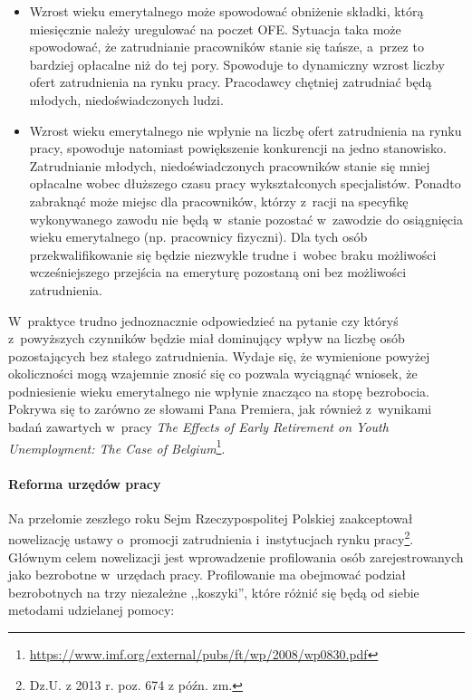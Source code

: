 \documentclass[12pt]{article}
\begin{document}
    \begin{itemize}
        \item Wzrost wieku emerytalnego może spowodować obniżenie składki, którą miesięcznie należy uregulować na poczet OFE. Sytuacja taka może spowodować, że zatrudnianie pracowników stanie się tańsze, a~przez to bardziej opłacalne niż do tej pory. Spowoduje to dynamiczny wzrost liczby ofert zatrudnienia na rynku pracy. Pracodawcy chętniej zatrudniać będą młodych, niedoświadczonych ludzi.
        \item Wzrost wieku emerytalnego nie wpłynie na liczbę ofert zatrudnienia na rynku pracy, spowoduje natomiast powiększenie konkurencji na jedno stanowisko. Zatrudnianie młodych, niedoświadczonych pracowników stanie się mniej opłacalne wobec dłuższego czasu pracy wykształconych specjalistów. Ponadto zabraknąć może miejsc dla pracowników, którzy z~racji na specyfikę wykonywanego zawodu nie będą w~stanie pozostać w~zawodzie do osiągnięcia wieku emerytalnego (np. pracownicy fizyczni). Dla tych osób przekwalifikowanie się będzie niezwykle trudne i~wobec braku możliwości wcześniejszego przejścia na emeryturę pozostaną oni bez możliwości zatrudnienia. 
    \end{itemize}
 
    W~praktyce trudno jednoznacznie odpowiedzieć na pytanie czy któryś z~powyższych czynników będzie miał dominujący wpływ na liczbę osób pozostających bez stałego zatrudnienia. Wydaje się, że wymienione powyżej okoliczności mogą wzajemnie znosić się co pozwala wyciągnąć wniosek, że podniesienie wieku emerytalnego nie wpłynie znacząco na stopę bezrobocia. Pokrywa się to zarówno ze słowami Pana Premiera, jak również z~wynikami badań zawartych w~pracy \emph{The Effects of Early Retirement on Youth Unemployment: The Case of Belgium}\footnote{\url{https://www.imf.org/external/pubs/ft/wp/2008/wp0830.pdf}}.
    
    \paragraph{Reforma urzędów pracy}
    
    Na przełomie zeszłego roku Sejm Rzeczypospolitej Polskiej zaakceptował nowelizację ustawy o~promocji zatrudnienia i~instytucjach rynku pracy\footnote{Dz.U. z 2013 r. poz. 674 z późn. zm.}. Głównym celem nowelizacji jest wprowadzenie profilowania osób zarejestrowanych jako bezrobotne w~urzędach pracy. Profilowanie ma obejmować podział bezrobotnych na trzy niezależne ,,koszyki'', które różnić się będą od siebie metodami udzielanej pomocy:
    
\end{document}
